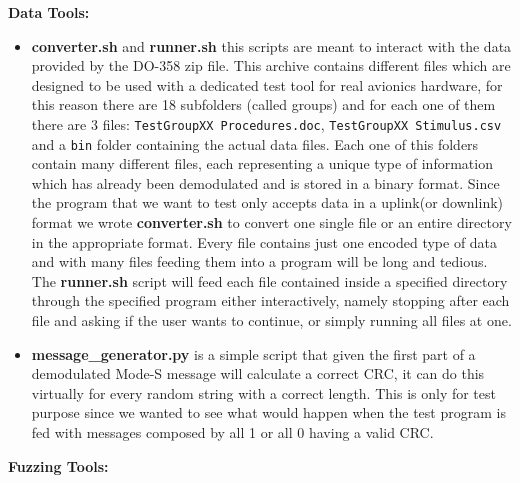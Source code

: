 \documentclass[../main.tex]{subfiles}
\begin{document}
\textbf{Data Tools:}

\begin{itemize}

  \item \textbf{converter.sh} and \textbf{runner.sh} this scripts are meant to
  interact with the data provided by the DO-358 zip file. This archive contains
  different files which are designed to be used with a dedicated test tool for
  real  avionics hardware, for  this reason there are 18 subfolders (called
  groups)  and for each one of them  there are 3 files: \texttt{TestGroupXX
  Procedures.doc}, \texttt{TestGroupXX  Stimulus.csv} and a \texttt{bin} folder
  containing the actual data files.  Each one of this folders contain many
  different files,  each representing a unique type of  information which has
  already been  demodulated and is stored in a binary  format. Since the program
  that we want  to test only accepts data in a  uplink(or downlink) format we
  wrote  \textbf{converter.sh} to convert one  single file or an entire
  directory in  the appropriate format. Every file  contains just one encoded
  type of data and  with many files feeding them into a  program will be long
  and tedious. The  \textbf{runner.sh} script will feed each  file contained
  inside a specified  directory through the specified program  either
  interactively, namely stopping  after each file and asking if the user  wants
  to continue, or simply running  all files at one.


  \item \textbf{message\_generator.py} is a simple script that given the first
  part of a demodulated Mode-S message will calculate a correct CRC, it can do
  this virtually for every random string with a correct length. This is only for
  test purpose since we wanted to see what would happen when the test program is
  fed with messages composed by all 1 or all 0 having a valid CRC.

\end{itemize}

\textbf{Fuzzing Tools:}
\end{document}
